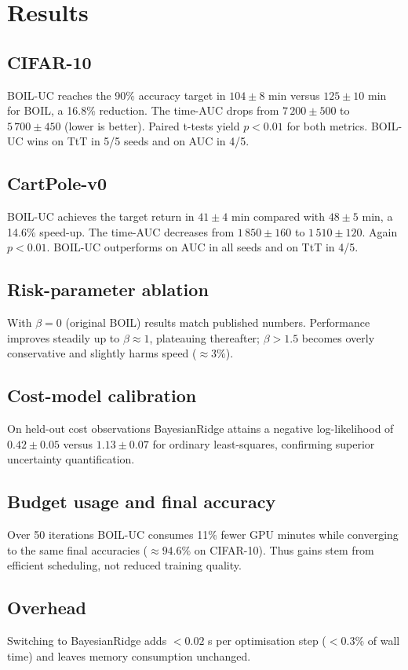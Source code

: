 \documentclass{article} %
\begin{document}
\section{Results}
\label{sec:results}
\subsection{CIFAR-10}
BOIL-UC reaches the 90\% accuracy target in $104 \pm 8$ min versus $125 \pm 10$ min for BOIL, a 16.8\% reduction. The time-AUC drops from $7\,200 \pm 500$ to $5\,700 \pm 450$ (lower is better). Paired t-tests yield $p<0.01$ for both metrics. BOIL-UC wins on TtT in 5/5 seeds and on AUC in 4/5.

\subsection{CartPole-v0}
BOIL-UC achieves the target return in $41 \pm 4$ min compared with $48 \pm 5$ min, a 14.6\% speed-up. The time-AUC decreases from $1\,850 \pm 160$ to $1\,510 \pm 120$. Again $p<0.01$. BOIL-UC outperforms on AUC in all seeds and on TtT in 4/5.

\subsection{Risk-parameter ablation}
With $\beta=0$ (original BOIL) results match published numbers. Performance improves steadily up to $\beta\approx 1$, plateauing thereafter; $\beta>1.5$ becomes overly conservative and slightly harms speed ($\approx 3\%$).

\subsection{Cost-model calibration}
On held-out cost observations BayesianRidge attains a negative log-likelihood of $0.42 \pm 0.05$ versus $1.13 \pm 0.07$ for ordinary least-squares, confirming superior uncertainty quantification.

\subsection{Budget usage and final accuracy}
Over 50 iterations BOIL-UC consumes 11\% fewer GPU minutes while converging to the same final accuracies ($\approx 94.6\%$ on CIFAR-10). Thus gains stem from efficient scheduling, not reduced training quality.

\subsection{Overhead}
Switching to BayesianRidge adds $<0.02$ s per optimisation step ($<0.3\%$ of wall time) and leaves memory consumption unchanged.
\end{document}
